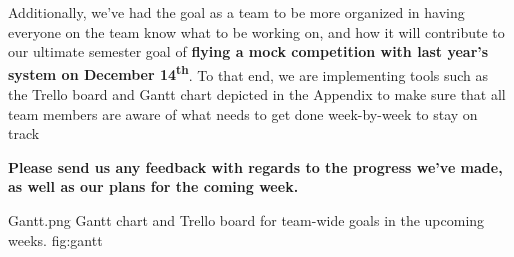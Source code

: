 \documentclass[]{../auvsi_doc}
\begin{document}
Additionally, we've had the goal as a team to be more organized in having everyone on the team know what to be working on, and how it will contribute to our ultimate semester goal of \textbf{flying a mock competition with last year's system on December 14\textsuperscript{th}}. To that end, we are implementing tools such as the Trello board and Gantt chart depicted in the Appendix to make sure that all team members are aware of what needs to get done week-by-week to stay on track

\textbf{Please send us any feedback with regards to the progress we've made, as well as our plans for the coming week.}

\newpage
\begin{appendices}

\AUVSIFigure
{Gantt.png}
{\textwidth}
{Gantt chart and Trello board for team-wide goals in the upcoming weeks.}
{fig:gantt}

\end{appendices}
\end{document}
